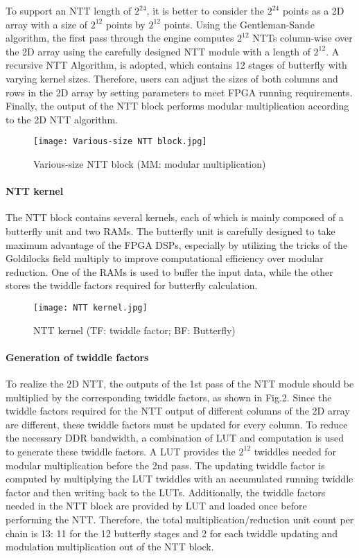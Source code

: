 To support an NTT length of $2^{24}$, it is better to consider the $2^{24}$ points as a 2D array with a size of $2^{12}$ points by $2^{12}$ points. Using the Gentleman-Sande algorithm, the first pass through the engine computes $2^{12}$ NTTs column-wise over the 2D array using the carefully designed NTT module with a length of $2^{12}$. A recursive NTT Algorithm, is adopted, which contains 12 stages of butterfly with varying kernel sizes. Therefore, users can adjust the sizes of both columns and rows in the 2D array by setting parameters to meet FPGA running requirements. Finally, the output of the NTT block performs modular multiplication according to the 2D NTT algorithm.

\begin{figure}[ht]
  \centering
  \texttt{[image: Various-size NTT block.jpg]}
  \caption{Various-size NTT block (MM: modular multiplication)}
  \label{fig:NTT_module}
\end{figure}

\paragraph{NTT kernel}
The NTT block contains several kernels, each of which is mainly composed of a butterfly unit and two RAMs. The butterfly unit is carefully designed to take maximum advantage of the FPGA DSPs, especially by utilizing the tricks of the Goldilocks field multiply to improve computational efficiency over modular reduction. One of the RAMs is used to buffer the input data, while the other stores the twiddle factors required for butterfly calculation.


\begin{figure}[ht]
  \centering
  \texttt{[image: NTT kernel.jpg]}
  \caption{NTT kernel (TF: twiddle factor; BF: Butterfly)}
  \label{fig:NTT_kernel}
\end{figure}

\paragraph{Generation of twiddle factors}

To realize the 2D NTT, the outputs of the 1st pass of the NTT module should be multiplied by the corresponding twiddle factors, as shown in Fig.2. Since the twiddle factors required for the NTT output of different columns of the 2D array are different, these twiddle factors must be updated for every column. To reduce the necessary DDR bandwidth, a combination of LUT and computation is used to generate these twiddle factors. A LUT provides the $2^{12}$ twiddles needed for modular multiplication before the 2nd pass. The updating twiddle factor is computed by multiplying the LUT twiddles with an accumulated running twiddle factor and then writing back to the LUTs. Additionally, the twiddle factors needed in the NTT block are provided by LUT and loaded once before performing the NTT. Therefore, the total multiplication/reduction unit count per chain is 13: 11 for the 12 butterfly stages and 2 for each twiddle updating and modulation multiplication out of the NTT block.

